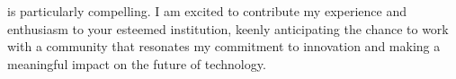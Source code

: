 is particularly compelling. I am excited to contribute my experience and enthusiasm to your esteemed institution, keenly anticipating the chance to work with a community that resonates my commitment to innovation and making a meaningful impact on the future of technology.